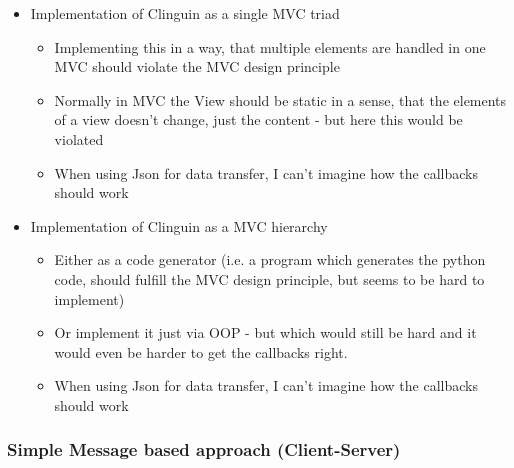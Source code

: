 \documentclass[12pt,a4paper]{article}
\newcommand{\<}[1]{\guilsinglleft}
\renewcommand{\>}[1]{\guilsinglright}
\begin{document}
\begin{itemize}
    \item Implementation of Clinguin as a single MVC triad
    \begin{itemize}
        \item Implementing this in a way, that multiple elements are handled in one MVC should violate the MVC design principle
        \item Normally in MVC the View should be static in a sense, that the elements of a view doesn't change, just the content - but here this would be violated
        \item When using Json for data transfer, I can't imagine how the callbacks should work
    \end{itemize}
    \item Implementation of Clinguin as a MVC hierarchy
    \begin{itemize}
        \item Either as a code generator (i.e. a program which generates the python code, should fulfill the MVC design principle, but seems to be hard to implement)
        \item Or implement it just via OOP - but which would still be hard and it would even be harder to get the callbacks right.
        \item When using Json for data transfer, I can't imagine how the callbacks should work
    \end{itemize}
\end{itemize}


\subsubsection{Simple Message based approach (Client-Server)}
\end{document}
